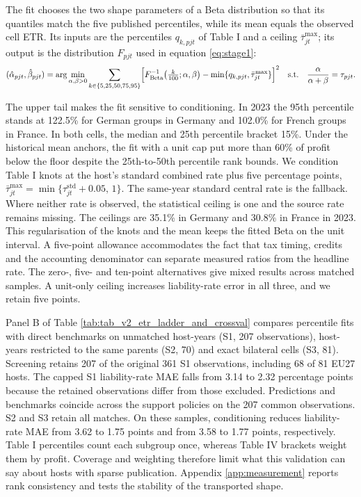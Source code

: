 \documentclass[11pt,a4paper]{article}
\begin{document}
The fit chooses the two shape parameters of a Beta distribution so that its quantiles match the five published percentiles, while its mean equals the observed cell ETR. Its inputs are the percentiles $q_{k,pjt}$ of Table I and a ceiling $\bar\tau^{\max}_{jt}$; its output is the distribution $F_{pjt}$ used in equation \eqref{eq:stage1}:
\begin{equation}\label{eq:betafit}
(\hat\alpha_{pjt},\hat\beta_{pjt})=\arg\min_{\alpha,\beta>0}\sum_{k\in\{5,25,50,75,95\}}\Bigl[F^{-1}_{\mathrm{Beta}}\bigl(\tfrac{k}{100};\alpha,\beta\bigr)-\min\{q_{k,pjt},\bar\tau^{\max}_{jt}\}\Bigr]^2
\quad\text{s.t.}\quad \frac{\alpha}{\alpha+\beta}=\tau_{pjt}.
\end{equation}

The upper tail makes the fit sensitive to conditioning. In 2023 the 95th percentile stands at 122.5\% for German groups in Germany and 102.0\% for French groups in France. In both cells, the median and 25th percentile bracket 15\%. Under the historical mean anchors, the fit with a unit cap put more than 60\% of profit below the floor despite the 25th-to-50th percentile rank bounds. We condition Table I knots at the host's standard combined rate plus five percentage points, $\bar\tau^{\max}_{jt}=\min\{\tau^{\mathrm{std}}_{jt}+0.05,\,1\}$. The same-year standard central rate is the fallback. Where neither rate is observed, the statistical ceiling is one and the source rate remains missing. The ceilings are 35.1\% in Germany and 30.8\% in France in 2023. This regularisation of the knots and the mean keeps the fitted Beta on the unit interval. A five-point allowance accommodates the fact that tax timing, credits and the accounting denominator can separate measured ratios from the headline rate. The zero-, five- and ten-point alternatives give mixed results across matched samples. A unit-only ceiling increases liability-rate error in all three, and we retain five points.

Panel B of Table \ref{tab:tab_v2_etr_ladder_and_crossval} compares percentile fits with direct benchmarks on unmatched host-years (S1, 207 observations), host-years restricted to the same parents (S2, 70) and exact bilateral cells (S3, 81). Screening retains 207 of the original 361 S1 observations, including 68 of 81 EU27 hosts. The capped S1 liability-rate MAE falls from 3.14 to 2.32 percentage points because the retained observations differ from those excluded. Predictions and benchmarks coincide across the support policies on the 207 common observations. S2 and S3 retain all matches. On these samples, conditioning reduces liability-rate MAE from 3.62 to 1.75 points and from 3.58 to 1.77 points, respectively. Table I percentiles count each subgroup once, whereas Table IV brackets weight them by profit. Coverage and weighting therefore limit what this validation can say about hosts with sparse publication. Appendix \ref{app:measurement} reports rank consistency and tests the stability of the transported shape.
\end{document}
